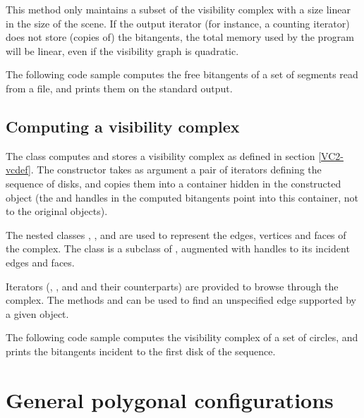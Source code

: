 This method only maintains a subset of the visibility complex with a size
linear in the size of the scene. If the output iterator (for instance, a
counting iterator) does not store (copies of) the bitangents, the total
memory used by the program will be linear, even if the visibility graph is
quadratic.

The following code sample computes the free bitangents of a set of segments
read from a file, and prints them on the standard output.


\subsection{Computing a visibility complex}

The class  computes and stores a
visibility complex as defined in section \ref{VC2-vcdef}. The constructor
takes as argument a pair of iterators defining the sequence of disks, and
copies them into a container hidden in the constructed object (the
 and  handles in the computed
bitangents point into this container, not to the original objects).

The nested classes ,
, and
 are used to represent the
edges, vertices and faces of the complex. The class  is a
subclass of , augmented with handles to
its incident edges and faces.

Iterators (, ,  and
 and their  counterparts) are provided to
browse through the complex. The methods  and
 can be used to find an unspecified edge supported by a
given object.

The following code sample computes the visibility complex of a set of
circles, and prints the bitangents incident to the first disk of the
sequence.




\section{General polygonal configurations}

